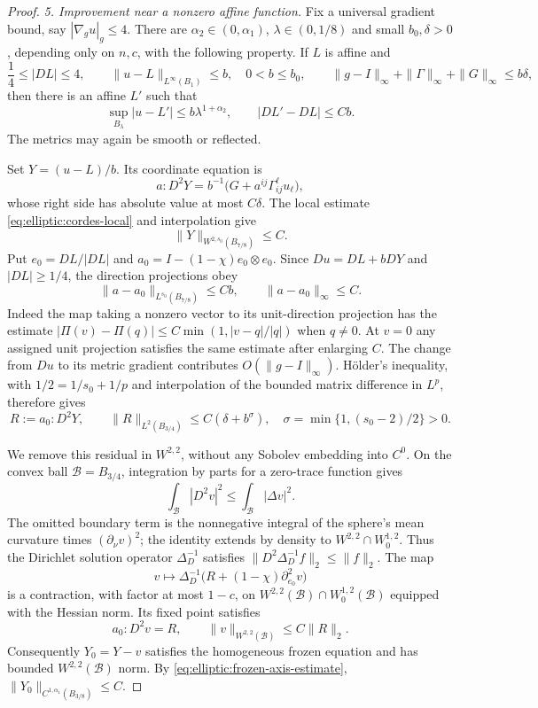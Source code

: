 \begin{proof}
\medskip\noindent
\emph{5. Improvement near a nonzero affine function.}
Fix a universal gradient bound, say $|\nabla_g u|_g\leq4$.
There are $\alpha_2\in(0,\alpha_1)$, $\lambda\in(0,1/8)$ and small
$b_0,\delta>0$, depending only on $n,c$, with the following property.
If $L$ is affine and
\begin{equation}
 \frac14\leq|DL|\leq4,\qquad
 \|u-L\|_{L^\infty(B_1)}\leq b,\quad 0<b\leq b_0,
 \qquad
 \|g-I\|_\infty+\|\Gamma\|_\infty+\|G\|_\infty\leq b\delta,
 \label{eq:elliptic:affine-improvement-hypotheses}
\end{equation}
then there is an affine $L'$ such that
\begin{equation}
 \sup_{B_\lambda}|u-L'|\leq b\lambda^{1+\alpha_2},
 \qquad |DL'-DL|\leq Cb.
 \label{eq:elliptic:affine-improvement}
\end{equation}
The metrics may again be smooth or reflected.

Set $Y=(u-L)/b$.  Its coordinate equation is
\[
 a:D^2Y=b^{-1}\bigl(G+a^{ij}\Gamma^\ell_{ij}u_\ell\bigr),
\]
whose right side has absolute value at most $C\delta$.
The local estimate \eqref{eq:elliptic:cordes-local} and interpolation give
\begin{equation}
 \|Y\|_{W^{2,s_0}(B_{7/8})}\leq C.
 \label{eq:elliptic:normalized-remainder-sobolev}
\end{equation}
Put $e_0=DL/|DL|$ and $a_0=I-(1-\chi)e_0\otimes e_0$.
Since $Du=DL+bDY$ and $|DL|\geq1/4$, the direction projections obey
\[
 \|a-a_0\|_{L^{s_0}(B_{7/8})}\leq Cb,
 \qquad\|a-a_0\|_\infty\leq C.
\]
Indeed the map taking a nonzero vector to its unit-direction projection
has the estimate
$|\Pi(v)-\Pi(q)|\leq C\min(1,|v-q|/|q|)$ when $q\ne0$.
At $v=0$ any assigned unit projection satisfies the same estimate after
enlarging $C$.  The change from $Du$ to its metric gradient contributes
$O(\|g-I\|_\infty)$.
H\"older's inequality, with
$1/2=1/s_0+1/p$ and interpolation of the bounded matrix difference in
$L^p$, therefore gives
\begin{equation}
 R:=a_0:D^2Y,\qquad
 \|R\|_{L^2(B_{3/4})}\leq C(\delta+b^\sigma),
 \quad \sigma=\min\{1,(s_0-2)/2\}>0.
 \label{eq:elliptic:frozen-residual}
\end{equation}

We remove this residual in $W^{2,2}$, without any Sobolev embedding into
$C^0$.  On the convex ball $\mathcal B=B_{3/4}$, integration by parts
for a zero-trace function gives
\[
 \int_{\mathcal B}|D^2v|^2
   \leq\int_{\mathcal B}|\Delta v|^2.
\]
The omitted boundary term is the nonnegative integral of the sphere's
mean curvature times $(\partial_\nu v)^2$; the identity extends by
density to $W^{2,2}\cap W^{1,2}_0$.
Thus the Dirichlet solution operator $\Delta_D^{-1}$ satisfies
$\|D^2\Delta_D^{-1}f\|_2\leq\|f\|_2$.  The map
\[
 v\longmapsto\Delta_D^{-1}\bigl(R+(1-\chi)\partial_{e_0}^2v\bigr)
\]
is a contraction, with factor at most $1-c$, on
$W^{2,2}(\mathcal B)\cap W^{1,2}_0(\mathcal B)$ equipped with the Hessian
norm.  Its fixed point satisfies
\[
 a_0:D^2v=R,\qquad
 \|v\|_{W^{2,2}(\mathcal B)}\leq C\|R\|_2.
\]
Consequently $Y_0=Y-v$ satisfies the homogeneous frozen equation and has
bounded $W^{2,2}(\mathcal B)$ norm.  By
\eqref{eq:elliptic:frozen-axis-estimate},
$\|Y_0\|_{C^{1,\alpha_1}(B_{3/8})}\leq C$.


\end{proof}
